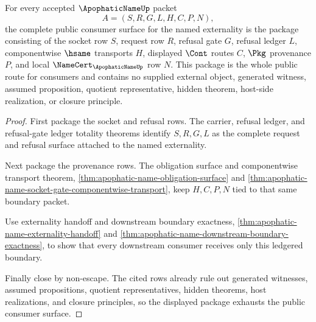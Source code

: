 \begin{theorem}
\label{thm:apophatic-name-externality-consumer-totality}
For every accepted $\ApophaticNameUp$ packet
$$
A=(S,R,G,L,H,C,P,N),
$$
the complete public consumer surface for the named externality is the package consisting of the socket row $S$, request row $R$, refusal gate $G$, refusal ledger $L$, componentwise $\hsame$ transports $H$, displayed $\Cont$ routes $C$, $\Pkg$ provenance $P$, and local $\NameCert_{\ApophaticNameUp}$ row $N$. This package is the whole public route for consumers and contains no supplied external object, generated witness, assumed proposition, quotient representative, hidden theorem, host-side realization, or closure principle.
\end{theorem}
\begin{proof}
First package the socket and refusal rows. The carrier, refusal ledger, and refusal-gate ledger totality theorems identify $S,R,G,L$ as the complete request and refusal surface attached to the named externality.

Next package the provenance rows. The obligation surface and componentwise transport theorem, \autoref{thm:apophatic-name-obligation-surface} and \autoref{thm:apophatic-name-socket-gate-componentwise-transport}, keep $H,C,P,N$ tied to that same boundary packet.

Use externality handoff and downstream boundary exactness, \autoref{thm:apophatic-name-externality-handoff} and \autoref{thm:apophatic-name-downstream-boundary-exactness}, to show that every downstream consumer receives only this ledgered boundary.

Finally close by non-escape. The cited rows already rule out generated witnesses, assumed propositions, quotient representatives, hidden theorems, host realizations, and closure principles, so the displayed package exhausts the public consumer surface.
\end{proof}

